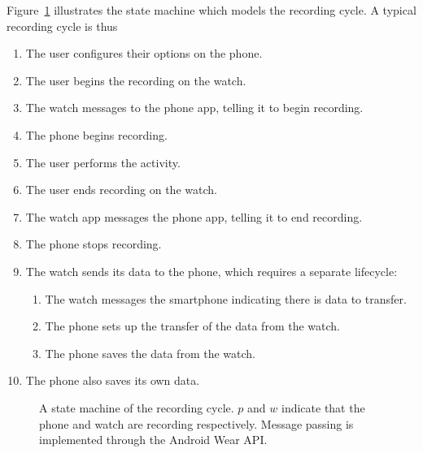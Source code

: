       Figure~\ref{fig:recordingstatemachine} illustrates the state machine which models the recording cycle. A typical recording cycle is thus
      \begin{enumerate}
        \item The user configures their options on the phone.
        \item The user begins the recording on the watch.
        \item The watch messages to the phone app, telling it to begin recording.
        \item The phone begins recording.
        \item The user performs the activity.
        \item The user ends recording on the watch.
        \item The watch app messages the phone app, telling it to end recording.
        \item The phone stops recording.
        \item The watch sends its data to the phone, which requires a separate lifecycle:
        \begin{enumerate}
          \item The watch messages the smartphone indicating there is data to transfer.
          \item The phone sets up the transfer of the data from the watch.
          \item The phone saves the data from the watch.
        \end{enumerate}
        \item The phone also saves its own data.
      \end{enumerate}
      
      \begin{figure}[!th]
        \centering
        \caption{A state machine of the recording cycle. $p$ and $w$ indicate that the phone and watch are recording respectively. Message passing is implemented through the Android Wear API.}
        \label{fig:recordingstatemachine}
      \end{figure}
      
